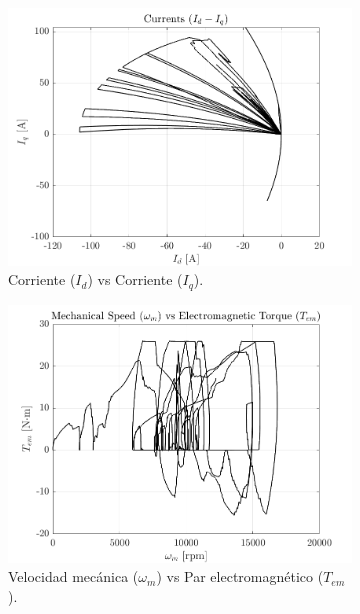 \begin{figure}[!htb]
\begin{subfigure}{0.4\textwidth}
        \includegraphics[width=\linewidth]{fig/id-iq_plot.png}
        \caption{Corriente ($I_{d}$) vs Corriente ($I_{q}$).}
    \end{subfigure}
    \begin{subfigure}{0.4\textwidth}
        \includegraphics[width=\linewidth]{fig/wm_Tem_plot.png}
        \caption{Velocidad mecánica ($\omega_{m}$) vs Par electromagnético ($T_{em}$).}
    \end{subfigure}
    \begin{subfigure}{0.4\textwidth}

\end{subfigure}
\end{figure}
